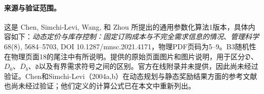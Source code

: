\documentclass[11pt]{article}
\begin{document}
\paragraph{来源与验证范围。}
这是 Chen, Simchi-Levi, Wang, 和 Zhou 所提出的通用参数化算法1版本，具体内容如下：\emph{动态定价与库存控制：固定订购成本与不完全需求信息的情况}、\emph{管理科学}68(8), 5684–5703, DOI 10.1287/mnsc.2021.4171，物理PDF页码为5–9。B3随机性在物理页面18的尾注中有所说明。提供的原始页面图片和图片说明，用于区分\(\mathfrak D\)、\(D_0\)、\(\overline D_b\)、\(\mathfrak d\)以及有界需求符号之间的区别。官方在线附录并未提供，因此尚未经过验证。Chen和Simchi-Levi（2004a,b）在动态规划与静态奖励结果方面的参考文献也尚未经过验证；他们定义的计算公式已在本文中重新列出。
\end{document}
